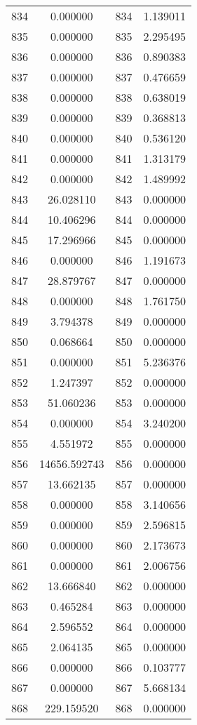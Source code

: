 \documentclass[12pt]{article}
\begin{document}
\begin{longtable}{@{}cccc@{}}
834 & 0.000000 & 834 & 1.139011 \\
835 & 0.000000 & 835 & 2.295495 \\
836 & 0.000000 & 836 & 0.890383 \\
837 & 0.000000 & 837 & 0.476659 \\
838 & 0.000000 & 838 & 0.638019 \\
839 & 0.000000 & 839 & 0.368813 \\
840 & 0.000000 & 840 & 0.536120 \\
841 & 0.000000 & 841 & 1.313179 \\
842 & 0.000000 & 842 & 1.489992 \\
843 & 26.028110 & 843 & 0.000000 \\
844 & 10.406296 & 844 & 0.000000 \\
845 & 17.296966 & 845 & 0.000000 \\
846 & 0.000000 & 846 & 1.191673 \\
847 & 28.879767 & 847 & 0.000000 \\
848 & 0.000000 & 848 & 1.761750 \\
849 & 3.794378 & 849 & 0.000000 \\
850 & 0.068664 & 850 & 0.000000 \\
851 & 0.000000 & 851 & 5.236376 \\
852 & 1.247397 & 852 & 0.000000 \\
853 & 51.060236 & 853 & 0.000000 \\
854 & 0.000000 & 854 & 3.240200 \\
855 & 4.551972 & 855 & 0.000000 \\
856 & 14656.592743 & 856 & 0.000000 \\
857 & 13.662135 & 857 & 0.000000 \\
858 & 0.000000 & 858 & 3.140656 \\
859 & 0.000000 & 859 & 2.596815 \\
860 & 0.000000 & 860 & 2.173673 \\
861 & 0.000000 & 861 & 2.006756 \\
862 & 13.666840 & 862 & 0.000000 \\
863 & 0.465284 & 863 & 0.000000 \\
864 & 2.596552 & 864 & 0.000000 \\
865 & 2.064135 & 865 & 0.000000 \\
866 & 0.000000 & 866 & 0.103777 \\
867 & 0.000000 & 867 & 5.668134 \\
868 & 229.159520 & 868 & 0.000000 \\

\end{longtable}
\end{document}
